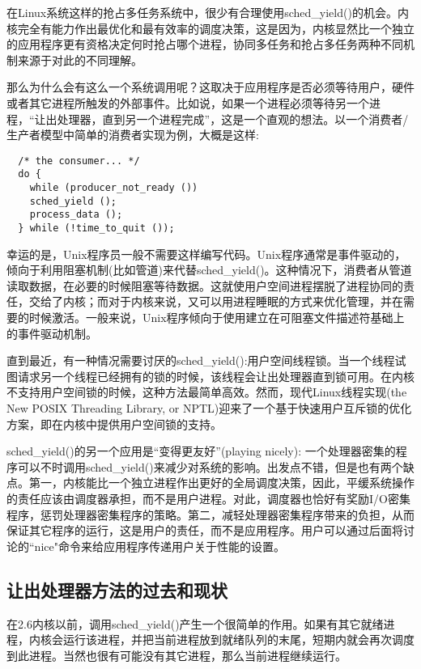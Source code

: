 在Linux系统这样的抢占多任务系统中，很少有合理使用sched\_yield()的机会。内核完全有能力作出最优化和最有效率的调度决策，这是因为，内核显然比一个独立的应用程序更有资格决定何时抢占哪个进程，协同多任务和抢占多任务两种不同机制来源于对此的不同理解。

那么为什么会有这么一个系统调用呢？这取决于应用程序是否必须等待用户，硬件或者其它进程所触发的外部事件。比如说，如果一个进程必须等待另一个进程，“让出处理器，直到另一个进程完成”，这是一个直观的想法。以一个消费者/生产者模型中简单的消费者实现为例，大概是这样:

\begin{lstlisting}
  /* the consumer... */
  do {
    while (producer_not_ready ())
    sched_yield ();
    process_data ();
  } while (!time_to_quit ());
\end{lstlisting}

幸运的是，Unix程序员一般不需要这样编写代码。Unix程序通常是事件驱动的，倾向于利用阻塞机制(比如管道)来代替sched\_yield()。这种情况下，消费者从管道读取数据，在必要的时候阻塞等待数据。这就使用户空间进程摆脱了进程协同的责任，交给了内核；而对于内核来说，又可以用进程睡眠的方式来优化管理，并在需要的时候激活。一般来说，Unix程序倾向于使用建立在可阻塞文件描述符基础上的事件驱动机制。

直到最近，有一种情况需要讨厌的sched\_yield():用户空间线程锁。当一个线程试图请求另一个线程已经拥有的锁的时候，该线程会让出处理器直到锁可用。在内核不支持用户空间锁的时候，这种方法最简单高效。然而，现代Linux线程实现(the New POSIX Threading Library, or NPTL)迎来了一个基于快速用户互斥锁的优化方案，即在内核中提供用户空间锁的支持。

sched\_yield()的另一个应用是“变得更友好”(playing nicely): 一个处理器密集的程序可以不时调用sched\_yield()来减少对系统的影响。出发点不错，但是也有两个缺点。第一，内核能比一个独立进程作出更好的全局调度决策，因此，平缓系统操作的责任应该由调度器承担，而不是用户进程。对此，调度器也恰好有奖励I/O密集程序，惩罚处理器密集程序的策略。第二，减轻处理器密集程序带来的负担，从而保证其它程序的运行，这是用户的责任，而不是应用程序。用户可以通过后面将讨论的``nice"命令来给应用程序传递用户关于性能的设置。

\subsection{让出处理器方法的过去和现状}

在2.6内核以前，调用sched\_yield()产生一个很简单的作用。如果有其它就绪进程，内核会运行该进程，并把当前进程放到就绪队列的末尾，短期内就会再次调度到此进程。当然也很有可能没有其它进程，那么当前进程继续运行。

